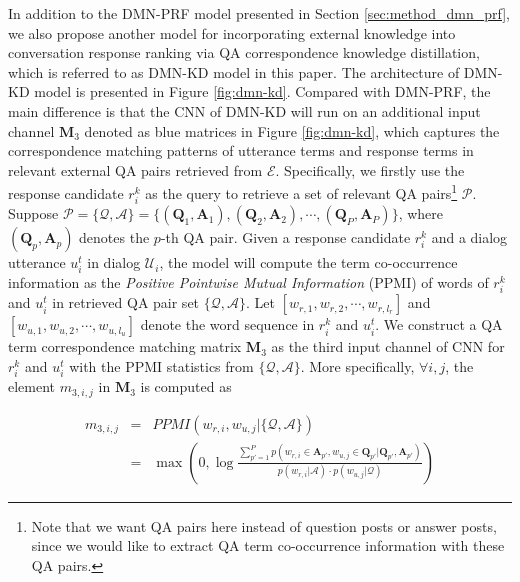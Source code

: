In addition to the DMN-PRF model presented in Section \ref{sec:method_dmn_prf}, we also propose another model for incorporating external knowledge into conversation response ranking via QA correspondence knowledge distillation, which is referred to as DMN-KD model in this paper. The architecture of DMN-KD model is presented in Figure \ref{fig:dmn-kd}. Compared with DMN-PRF, the main difference is that the CNN of DMN-KD will run on an additional input channel $\mathbf{M}_3$ denoted as blue matrices in Figure \ref{fig:dmn-kd}, which captures the correspondence matching patterns of utterance terms and response terms in relevant external QA pairs retrieved from $\mathcal{E}$. Specifically, we firstly use the response candidate $r_i^k$ as the query to retrieve a set of relevant QA pairs\footnote{Note that we want QA pairs here instead of question posts or answer posts, since we would like to extract QA term co-occurrence information with these QA pairs.}  $\mathcal{P}$. Suppose $\mathcal{P} = \{ \mathcal{Q}, \mathcal{A}\}  = \{(\mathbf{Q}_1, \mathbf{A}_1), (\mathbf{Q}_2, \mathbf{A}_2), \cdots, (\mathbf{Q}_P, \mathbf{A}_P) \}$, where $(\mathbf{Q}_p, \mathbf{A}_p)$ denotes the $p$-th QA pair. Given a response candidate $r_i^k$ and a dialog utterance $u_i^t$ in dialog $\mathcal{U}_i$, the model will compute the term co-occurrence information as the \textit{Positive Pointwise Mutual Information} (PPMI) of words of $r_i^k$ and  $u_i^t$ in retrieved QA pair set $\{ \mathcal{Q}, \mathcal{A}\} $. Let $[w_{r,1}, w_{r,2}, \cdots, w_{r, l_r}]$ and $[w_{u,1}, w_{u,2}, \cdots, w_{u, l_u}]$ denote the word sequence in $r_i^k$ and  $u_i^t$. We construct a QA term correspondence matching matrix $\mathbf{M}_3$ as the third input channel of CNN for $r_i^k$ and  $u_i^t$ with the PPMI statistics from $\{ \mathcal{Q}, \mathcal{A}\} $. More specifically, $\forall i, j$, the element $m_{3,i,j}$ in  $\mathbf{M}_3$ is computed as 

\vspace{-0.1in}
 \begin{footnotesize}
\begin{eqnarray}\label{Eqn:kd_co_occurrence_matrix}
m_{3,i,j} &=& PPMI(w_{r,i}, w_{u,j}|\{\mathcal{Q}, \mathcal{A}\})    \\
&=& \max(0, \log \frac{ \sum_{p'=1}^P p(w_{r,i} \in \mathbf{A}_{p'}, w_{u,j} \in \mathbf{Q}_{p'}|\mathbf{Q}_{p'}, \mathbf{A}_{p'})  }{p(w_{r,i}|\mathcal{A}) \cdot p(w_{u,j}|\mathcal{Q})}) \nonumber
\end{eqnarray}
\vspace{-0.1in}
\end{footnotesize}

